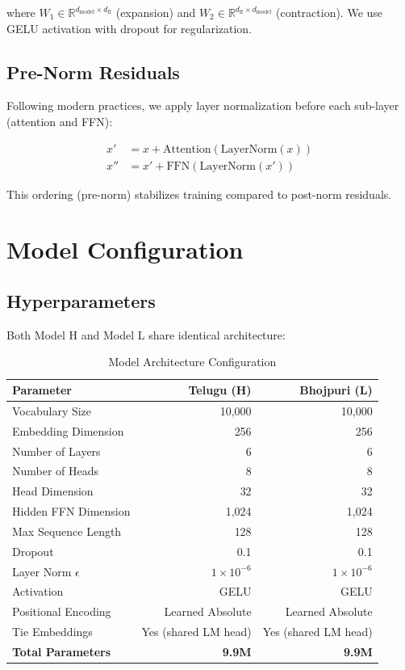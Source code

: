 \documentclass[11pt,a4paper]{article}
\begin{document}
where $W_1 \in \mathbb{R}^{d_{\text{model}} \times d_{\text{ff}}}$ (expansion) and $W_2 \in \mathbb{R}^{d_{\text{ff}} \times d_{\text{model}}}$ (contraction). We use GELU activation with dropout for regularization.

\subsection{Pre-Norm Residuals}

Following modern practices, we apply layer normalization before each sub-layer (attention and FFN):

\begin{equation}
\begin{aligned}
x' &= x + \text{Attention}(\text{LayerNorm}(x)) \\
x'' &= x' + \text{FFN}(\text{LayerNorm}(x'))
\end{aligned}
\end{equation}

This ordering (pre-norm) stabilizes training compared to post-norm residuals.

\section{Model Configuration}

\subsection{Hyperparameters}

Both Model H and Model L share identical architecture:

\begin{table}[H]
\centering
\begin{tabular}{lrr}
\toprule
\textbf{Parameter} & \textbf{Telugu (H)} & \textbf{Bhojpuri (L)} \\
\midrule
Vocabulary Size & 10,000 & 10,000 \\
Embedding Dimension & 256 & 256 \\
Number of Layers & 6 & 6 \\
Number of Heads & 8 & 8 \\
Head Dimension & 32 & 32 \\
Hidden FFN Dimension & 1,024 & 1,024 \\
Max Sequence Length & 128 & 128 \\
Dropout & 0.1 & 0.1 \\
Layer Norm $\epsilon$ & $1 \times 10^{-6}$ & $1 \times 10^{-6}$ \\
Activation & GELU & GELU \\
Positional Encoding & Learned Absolute & Learned Absolute \\
Tie Embeddings & Yes (shared LM head) & Yes (shared LM head) \\
\midrule
\textbf{Total Parameters} & \textbf{9.9M} & \textbf{9.9M} \\
\bottomrule
\end{tabular}
\caption{Model Architecture Configuration}
\end{table}
\end{document}
